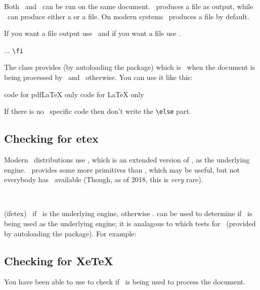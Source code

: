     Both \ltx\ and \pixpdfltx\ can be run on the same document. \ltx\ produces
a  file as output, while \pixpdfltx\ can produce either a
 or a  file. 
    On modern systems \pixpdfltx\ produces a  file by default.

If you want a  file output use \ltx\ and if you want a
 file use \pdfltx.

\begin{syntax}
 ... \verb?\fi? \\
\end{syntax}
The class provides  (by autoloading the 
package) which is \ptrue\ when the document is
being processed by \pixpdfltx\ and \pfalse\ otherwise. You can use it like this:
\begin{lcode}
\ifpdf
  code for pdfLaTeX only 
\else
  code for LaTeX only
\fi
\end{lcode}
If there is no \ltx\ specific code then don't write the \verb?\else? part.

\subsection{Checking for etex}

    Modern \ltx\ distributions use \pixetx, which is an extended version
of \tx, as the underlying engine. \pixetx\ provides some more primitives
than \tx, which may be useful, but not everybody has \pixetx\
available (Though, as of 2018, this is \emph{very} rare).

\begin{syntax}
 \\
\end{syntax}
\glossary(ifetex)%
{}%
{\ptrue\ if \etx\ is the underlying engine, otherwise \pfalse.}
\piif{ifetex} can be used to determine if \pixetx\ is being used as
the underlying engine; it is analagous to \piif{ifpdf} which tests for
\pixpdfltx\ (provided by autoloading the \Lpack{ifetex} package). For
example:
\begin{lcode}
\ifetex
\else
\fi
\end{lcode}


\subsection{Checking for XeTeX}

    You have been able to use  to check if \pixpdfltx\ is being used 
to process the document.

